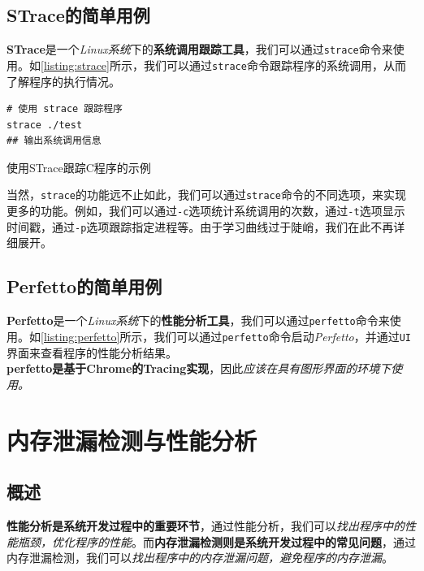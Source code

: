 \subsection{STrace的简单用例}

\textbf{STrace}是一个\textit{Linux系统}下的\textbf{系统调用跟踪工具}，我们可以通过\texttt{strace}命令来使用。如\ref{listing:strace}所示，我们可以通过\texttt{strace}命令跟踪程序的系统调用，从而了解程序的执行情况。\\

\begin{longlisting}
    \begin{verbatim}
# 使用 strace 跟踪程序
strace ./test
## 输出系统调用信息
    \end{verbatim}
    \caption{使用STrace跟踪C程序的示例}
    \label{listing:strace}
\end{longlisting}

当然，\texttt{strace}的功能远不止如此，我们可以通过\texttt{strace}命令的不同选项，来实现更多的功能。例如，我们可以通过\texttt{-c}选项统计系统调用的次数，通过\texttt{-t}选项显示时间戳，通过\texttt{-p}选项跟踪指定进程等。由于学习曲线过于陡峭，我们在此不再详细展开。

\subsection{Perfetto的简单用例}

\textbf{Perfetto}是一个\textit{Linux系统}下的\textbf{性能分析工具}，我们可以通过\texttt{perfetto}命令来使用。如\ref{listing:perfetto}所示，我们可以通过\texttt{perfetto}命令启动\textit{Perfetto}，并通过\texttt{UI}界面来查看程序的性能分析结果。\\

\textbf{perfetto是基于Chrome的Tracing实现}，因此\textit{应该在具有图形界面的环境下使用。}

\section{内存泄漏检测与性能分析}

\subsection{概述}

\textbf{性能分析是系统开发过程中的重要环节}，通过性能分析，我们可以\textit{找出程序中的性能瓶颈，优化程序的性能}。而\textbf{内存泄漏检测则是系统开发过程中的常见问题}，通过内存泄漏检测，我们可以\textit{找出程序中的内存泄漏问题，避免程序的内存泄漏}。\\

